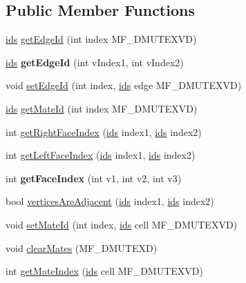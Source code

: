 \subsection*{Public Member Functions}
\begin{DoxyCompactItemize}
\item 
\hyperlink{classmf_1_1mfBase_a3b23f16ddf59da0a91ab12cf57c1f111}{ids} \hyperlink{classmf_1_1mfHexaCell_a462f9ea4abee25cd3ded82266d04ebd2}{getEdgeId} (int index MF\_\-DMUTEXVD)
\item 
\hypertarget{classmf_1_1mfHexaCell_a3e975d0797cb0c6c4b195835ced52768}{
\hyperlink{classmf_1_1mfBase_a3b23f16ddf59da0a91ab12cf57c1f111}{ids} {\bfseries getEdgeId} (int vIndex1, int vIndex2)}
\label{classmf_1_1mfHexaCell_a3e975d0797cb0c6c4b195835ced52768}

\item 
void \hyperlink{classmf_1_1mfHexaCell_abb7037b42074eaaab7c5a89806d83a29}{setEdgeId} (int index, \hyperlink{classmf_1_1mfBase_a3b23f16ddf59da0a91ab12cf57c1f111}{ids} edge MF\_\-DMUTEXVD)
\item 
\hyperlink{classmf_1_1mfBase_a3b23f16ddf59da0a91ab12cf57c1f111}{ids} \hyperlink{classmf_1_1mfHexaCell_a42fa61d5e21e646e99c905d20792b9c8}{getMateId} (int index MF\_\-DMUTEXVD)
\item 
int \hyperlink{classmf_1_1mfHexaCell_acdc84e16f19d1cd80f720b513463d887}{getRightFaceIndex} (\hyperlink{classmf_1_1mfBase_a3b23f16ddf59da0a91ab12cf57c1f111}{ids} index1, \hyperlink{classmf_1_1mfBase_a3b23f16ddf59da0a91ab12cf57c1f111}{ids} index2)
\item 
int \hyperlink{classmf_1_1mfHexaCell_a15b1537fa930940f61396aed2a743262}{getLeftFaceIndex} (\hyperlink{classmf_1_1mfBase_a3b23f16ddf59da0a91ab12cf57c1f111}{ids} index1, \hyperlink{classmf_1_1mfBase_a3b23f16ddf59da0a91ab12cf57c1f111}{ids} index2)
\item 
\hypertarget{classmf_1_1mfHexaCell_ae110f1775c1cb6fd09905aba9ff3771d}{
int {\bfseries getFaceIndex} (int v1, int v2, int v3)}
\label{classmf_1_1mfHexaCell_ae110f1775c1cb6fd09905aba9ff3771d}

\item 
bool \hyperlink{classmf_1_1mfHexaCell_a46516a81356a071d6aa1d582f63b4985}{verticesAreAdjacent} (\hyperlink{classmf_1_1mfBase_a3b23f16ddf59da0a91ab12cf57c1f111}{ids} index1, \hyperlink{classmf_1_1mfBase_a3b23f16ddf59da0a91ab12cf57c1f111}{ids} index2)
\item 
void \hyperlink{classmf_1_1mfHexaCell_ab512173b13d97508d23083de414491e9}{setMateId} (int index, \hyperlink{classmf_1_1mfBase_a3b23f16ddf59da0a91ab12cf57c1f111}{ids} cell MF\_\-DMUTEXVD)
\item 
void \hyperlink{classmf_1_1mfHexaCell_a924edba7b4baa1564851a09138c0d542}{clearMates} (MF\_\-DMUTEXD)
\item 
int \hyperlink{classmf_1_1mfHexaCell_ae40ba149ff474250c814bf6c7f3af415}{getMateIndex} (\hyperlink{classmf_1_1mfBase_a3b23f16ddf59da0a91ab12cf57c1f111}{ids} cell MF\_\-DMUTEXVD)
\end{DoxyCompactItemize}
